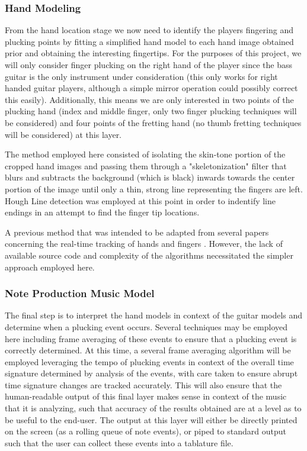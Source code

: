 \subsubsection{Hand Modeling}
From the hand location stage we now need to identify the players fingering and plucking points
by fitting a simplified hand model to each hand image obtained prior and obtaining the interesting fingertips.
For the purposes of this project, we will only consider finger plucking on the right hand of the player
since the bass guitar is the only instrument under consideration
(this only works for right handed guitar players, although a simple mirror operation could possibly correct this easily).
Additionally, this means we are only interested in two points of the plucking hand
(index and middle finger, only two finger plucking techniques will be considered)
and four points of the fretting hand (no thumb fretting techniques will be considered) at this layer.
\par
The method employed here consisted of isolating the skin-tone portion of the cropped hand images \cite{pyimagesearch,seereality}
and passing them through a "skeletonization" filter \cite{skeleton} that blurs and subtracts the background (which is black)
inwards towards the center portion of the image until only a thin, strong line representing the fingers are left.
Hough Line detection was employed at this point in order to indentify line endings in an attempt to find the finger tip locations.
\par
A previous method that was intended to be adapted from several papers concerning the real-time tracking of hands and fingers
\cite{aslhand,handposes,fingertracking}.
However, the lack of available source code and complexity of the algorithms necessitated the simpler approach employed here.

\subsubsection{Note Production Music Model}
The final step is to interpret the hand models in context of the guitar models and determine when a plucking event occurs.
Several techniques may be employed here including frame averaging of these events to ensure that a plucking event
is correctly determined.
At this time, a several frame averaging algorithm will be employed leveraging the tempo of plucking events in context of 
the overall time signature determined by analysis of the events, with care taken to ensure abrupt time signature changes
are tracked accurately.
This will also ensure that the human-readable output of this final layer makes sense in context of the music that it is
analyzing, such that accuracy of the results obtained are at a level as to be useful to the end-user.
The output at this layer will either be directly printed on the screen (as a rolling queue of note events),
or piped to standard output such that the user can collect these events into a tablature file.

